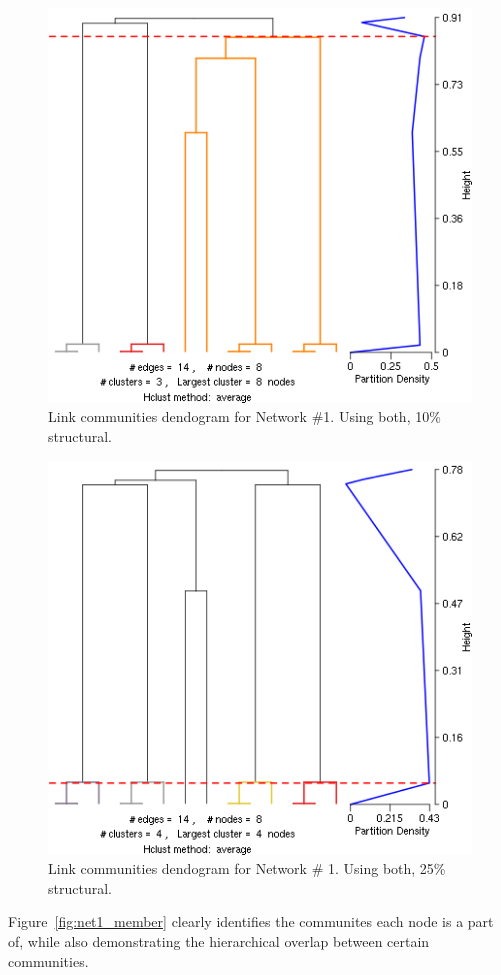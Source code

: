 \documentclass{report} %
\begin{document}
\begin{figure}[htp!]
  \centering
  \includegraphics[width=0.5\linewidth]{toy2/ea/lc_0.1.png}
  \caption{Link communities dendogram for Network \#1. Using both, 10\% structural.}
  \label{fig:net1_dend_10}
\end{figure}

\begin{figure}[htp!]
  \centering
  \includegraphics[width=0.5\linewidth]{toy2/ea/lc_0.25.png}
  \caption{Link communities dendogram for Network \# 1. Using both, 25\% structural.}
  \label{fig:net1_dend_25}
\end{figure}

Figure~\ref{fig:net1_member} clearly identifies the communites each node is a part of, while also demonstrating the hierarchical overlap between certain communities.\\
\end{document}
